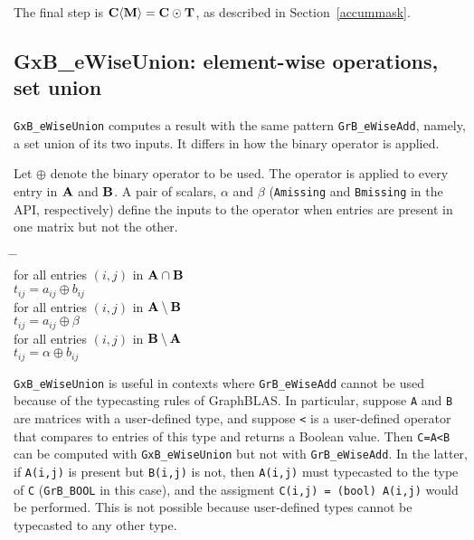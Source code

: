 \documentclass[12pt]{article}
\begin{document}
The final step is ${\bf C \langle M \rangle  = C \odot T}$, as described in
Section~\ref{accummask}.

\newpage
\subsection{{\sf GxB\_eWiseUnion:} element-wise operations, set union} %
\label{eWiseUnion}

\verb'GxB_eWiseUnion' computes a result with the same pattern
\verb'GrB_eWiseAdd', namely, a set union of its two inputs.  It differs in how
the binary operator is applied.

Let $\oplus$ denote the binary operator to be used.  The operator is applied to
every entry in $\bf A$ and $\bf B$.  A pair of scalars, $\alpha$ and $\beta$
(\verb'Amissing' and \verb'Bmissing' in the API, respectively) define the
inputs to the operator when entries are present in one matrix but not the
other.

    \vspace{-0.2in}
    {\small
    \begin{tabbing}
    \hspace{2em} \= \hspace{2em} \= \hspace{2em} \= \\
    \> for all entries $(i,j)$ in ${\bf A \cap B}$ \\
    \> \> $t_{ij} = a_{ij} \oplus b_{ij}$ \\
    \> for all entries $(i,j)$ in ${\bf A \setminus B}$ \\
    \> \> $t_{ij} = a_{ij} \oplus \beta $ \\
    \> for all entries $(i,j)$ in ${\bf B \setminus A}$ \\
    \> \> $t_{ij} = \alpha \oplus b_{ij}$
    \end{tabbing}
    }

\verb'GxB_eWiseUnion' is useful in contexts where \verb'GrB_eWiseAdd' cannot be
used because of the typecasting rules of GraphBLAS.  In particular, suppose
\verb'A' and \verb'B' are matrices with a user-defined type, and suppose
\verb'<' is a user-defined operator that compares to entries of this type and
returns a Boolean value.  Then \verb'C=A<B' can be computed with
\verb'GxB_eWiseUnion' but not with \verb'GrB_eWiseAdd'.  In the latter, if
\verb'A(i,j)' is present but \verb'B(i,j)' is not, then \verb'A(i,j)' must
typecasted to the type of \verb'C' (\verb'GrB_BOOL' in this case), and the
assigment \verb'C(i,j) = (bool) A(i,j)' would be performed.  This is not
possible because user-defined types cannot be typecasted to any other type.
\end{document}
